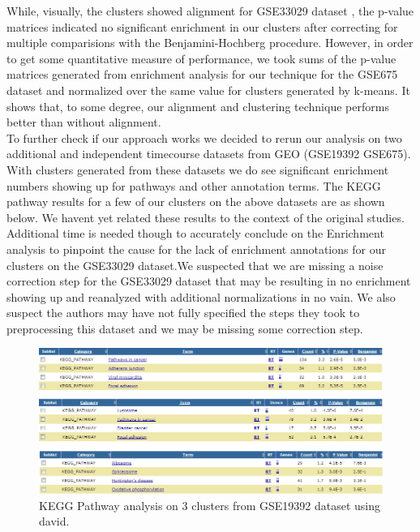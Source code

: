 \documentclass[aps,prd,final,onecolumn,a4paper,10pt]{revtex4}
\begin{document}
While, visually, the clusters showed alignment for GSE33029 dataset , the p-value matrices indicated no significant enrichment in our clusters after correcting for multiple comparisions with the Benjamini-Hochberg procedure. However, in order to get some quantitative measure of performance, we took sums of the p-value matrices generated from enrichment analysis for our technique for the GSE675 dataset and normalized over the same value for clusters generated by k-means. It shows that, to some degree, our alignment and clustering technique performs better than without alignment.\\

To further check if our approach works we decided to rerun our analysis on two additional and independent timecourse datasets from GEO (GSE19392 GSE675). With clusters generated from these datasets we do see significant enrichment numbers showing up for pathways and other annotation terms. The KEGG pathway results for a few of our clusters on the above datasets are as shown below. We havent yet related these results to the context of the original studies. Additional time is needed though to accurately conclude on the Enrichment analysis to pinpoint the cause for the lack of enrichment annotations for our clusters on the GSE33029 dataset.We suspected that we are missing a noise correction step for the GSE33029 dataset that may be resulting in no enrichment showing up and reanalyzed with additional normalizations in no vain. We also suspect the authors may have not fully specified the steps they took to preprocessing this dataset and we may be missing some correction step.


\begin{figure}[H]
\centering
\includegraphics[scale=0.65]{3Clusters_PathwayCombined.png}
\caption{KEGG Pathway analysis on 3 clusters from GSE19392 dataset using david.}
\label{fig:KEGGPathway.}
\end{figure}
\end{document}
